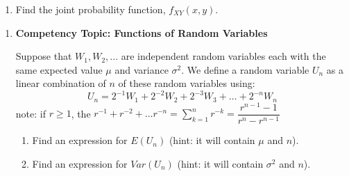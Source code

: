 \documentclass[11pt]{article}
\providecommand{\tightlist}{%
  \setlength{\itemsep}{0pt}\setlength{\parskip}{0pt}}
\begin{document}
\begin{enumerate}
\def\labelenumi{\alph{enumi}.}
\setcounter{enumi}{1}
\tightlist
\item
  Find the joint probability function, \(f_{XY}(x, y)\). \vspace{3cm}
\end{enumerate}

\newpage

\begin{enumerate}
\def\labelenumi{\arabic{enumi}.}
\setcounter{enumi}{3}
\item
  \textbf{Competency Topic: Functions of Random Variables}

  Suppose that \(W_1, W_2, ...\) are independent random variables each
  with the same expected value \(\mu\) and variance \(\sigma^2\). We
  define a random variable \(U_n\) as a linear combination of \(n\) of
  these random variables using:
  \[U_n = 2^{-1} W_1 + 2^{-2} W_2 + 2^{-3} W_3 + \ldots + 2^{-n} W_n\]
  note: if \(r \ge 1\), the
  \(r^{-1} + r^{-2} + \ldots r^{-n} = \sum_{k=1}^n r^{-k} = \dfrac{r^{n-1} - 1}{r^n - r^{n-1}}\)

  \begin{enumerate}
  \def\labelenumii{\alph{enumii}.}
  \tightlist
  \item
    Find an expression for \(E(U_n)\) (hint: it will contain \(\mu\) and
    \(n\)). \vspace{5cm}
  \item
    Find an expression for \(Var(U_n)\) (hint: it will contain
    \(\sigma^2\) and \(n\)).
  \end{enumerate}
\end{enumerate}
\end{document}
